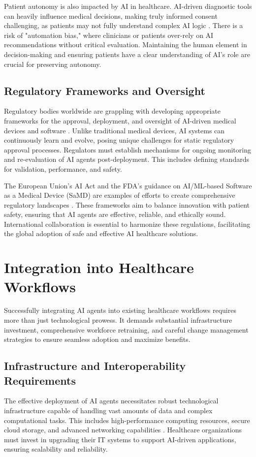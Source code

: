 \documentclass[12pt,a4paper]{article}
\begin{document}
Patient autonomy is also impacted by AI in healthcare. AI-driven diagnostic tools can heavily influence medical decisions, making truly informed consent challenging, as patients may not fully understand complex AI logic \cite{who2021ai}. There is a risk of "automation bias," where clinicians or patients over-rely on AI recommendations without critical evaluation. Maintaining the human element in decision-making and ensuring patients have a clear understanding of AI's role are crucial for preserving autonomy.

\subsection{Regulatory Frameworks and Oversight}
\label{sec:regulatory_frameworks}
Regulatory bodies worldwide are grappling with developing appropriate frameworks for the approval, deployment, and oversight of AI-driven medical devices and software \cite{gov_uk_mhra_roadmap}. Unlike traditional medical devices, AI systems can continuously learn and evolve, posing unique challenges for static regulatory approval processes. Regulators must establish mechanisms for ongoing monitoring and re-evaluation of AI agents post-deployment. This includes defining standards for validation, performance, and safety.

The European Union's AI Act and the FDA's guidance on AI/ML-based Software as a Medical Device (SaMD) are examples of efforts to create comprehensive regulatory landscapes \cite{regdesk_eu_ai_act, fda_ai_ml_samd}. These frameworks aim to balance innovation with patient safety, ensuring that AI agents are effective, reliable, and ethically sound. International collaboration is essential to harmonize these regulations, facilitating the global adoption of safe and effective AI healthcare solutions.

\section{Integration into Healthcare Workflows}
\label{sec:integration}
Successfully integrating AI agents into existing healthcare workflows requires more than just technological prowess. It demands substantial infrastructure investment, comprehensive workforce retraining, and careful change management strategies to ensure seamless adoption and maximize benefits.

\subsection{Infrastructure and Interoperability Requirements}
\label{sec:infrastructure}
The effective deployment of AI agents necessitates robust technological infrastructure capable of handling vast amounts of data and complex computational tasks. This includes high-performance computing resources, secure cloud storage, and advanced networking capabilities \cite{oracle_cloud}. Healthcare organizations must invest in upgrading their IT systems to support AI-driven applications, ensuring scalability and reliability.
\end{document}
